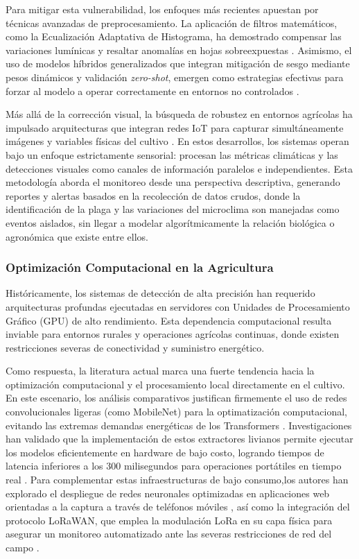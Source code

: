 \documentclass[12pt,letterpaper]{article}
\begin{document}
Para mitigar esta vulnerabilidad, los enfoques más recientes apuestan por técnicas avanzadas de preprocesamiento. La aplicación de filtros matemáticos, como la Ecualización Adaptativa de Histograma, ha demostrado compensar las variaciones lumínicas y resaltar anomalías en hojas sobreexpuestas \cite{cetiner2022citrus}. Asimismo, el uso de modelos híbridos generalizados que integran mitigación de sesgo mediante pesos dinámicos y validación \textit{zero-shot}, emergen como estrategias efectivas para forzar al modelo a operar correctamente en entornos no controlados \cite{wadhwa2026hybrid}.

Más allá de la corrección visual, la búsqueda de robustez en entornos agrícolas ha impulsado arquitecturas que integran redes IoT para capturar simultáneamente imágenes y variables físicas del cultivo \cite{quispe2024lora}. En estos desarrollos, los sistemas operan bajo un enfoque estrictamente sensorial: procesan las métricas climáticas y las detecciones visuales como canales de información paralelos e independientes. Esta metodología aborda el monitoreo desde una perspectiva descriptiva, generando reportes y alertas basados en la recolección de datos crudos, donde la identificación de la plaga y las variaciones del microclima son manejadas como eventos aislados, sin llegar a modelar algorítmicamente la relación biológica o agronómica que existe entre ellos.

\subsubsection{Optimización Computacional en la Agricultura}

Históricamente, los sistemas de detección de alta precisión han requerido arquitecturas profundas ejecutadas en servidores con Unidades de Procesamiento Gráfico (GPU) de alto rendimiento. Esta dependencia computacional resulta inviable para entornos rurales y operaciones agrícolas continuas, donde existen restricciones severas de conectividad y suministro energético.

Como respuesta, la literatura actual marca una fuerte tendencia hacia la optimización computacional y el procesamiento local directamente en el cultivo. En este escenario, los análisis comparativos justifican firmemente el uso de redes convolucionales ligeras (como MobileNet) para la optimatización computacional, evitando las extremas demandas energéticas de los Transformers \cite{mallick2025review}. Investigaciones han validado que la implementación de estos extractores livianos permite ejecutar los modelos eficientemente en hardware de bajo costo, logrando tiempos de latencia inferiores a los 300 milisegundos para operaciones portátiles en tiempo real \cite{wang2021portable}. Para complementar estas infraestructuras de bajo consumo,los autores han explorado el despliegue de redes neuronales optimizadas en aplicaciones web orientadas a la captura a través de teléfonos móviles \cite{cunha2024psyllid}, así como la integración del protocolo LoRaWAN, que emplea la modulación LoRa en su capa física para asegurar un monitoreo automatizado ante las severas restricciones de red del campo  \cite{quispe2024lora}.
\end{document}
